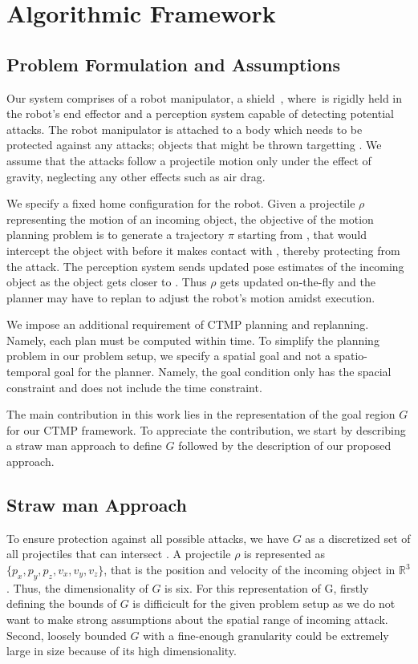 \documentclass[a4paper]{report}
\begin{document}
\section{Algorithmic Framework}
\subsection{Problem Formulation and Assumptions}
Our system comprises of a robot manipulator, a shield~\calS, where~\calS is rigidly held in the robot's end effector and a perception system capable of detecting potential attacks. The robot manipulator is attached to a body \calB which needs to be protected against any attacks; objects that might be thrown targetting \calB. We assume that the attacks follow a projectile motion only under the effect of gravity, neglecting any other effects such as air drag.

We specify a fixed home configuration \Shome for the robot. Given a projectile $\rho$ representing the motion of an incoming object, the objective of the motion planning problem is to generate a trajectory $\pi$ starting from \Shome, that would intercept the object with \calS before it makes contact with \calB, thereby protecting \calB from the attack.
%
The perception system sends updated pose estimates of the incoming object as the object gets closer to \calB. Thus $\rho$ gets updated on-the-fly and the planner may have to replan to adjust the robot's motion amidst execution.

We impose an additional requirement of CTMP planning and replanning. Namely, each plan must be computed within \Tbound time. To simplify the planning problem in our problem setup, we specify a spatial goal and not a spatio-temporal goal for the planner. Namely, the goal condition only has the spacial constraint and does not include the time constraint.

The main contribution in this work lies in the representation of the goal region $G$ for our CTMP framework. To appreciate the contribution, we start by describing a straw man approach to define $G$ followed by the description of our proposed approach.

\subsection{Straw man Approach}
To ensure protection against all possible attacks, we have $G$ as a discretized set of all projectiles that can intersect \calB. A projectile $\rho$ is represented as $\{p_x,p_y,p_z,v_x,v_y,v_z\}$, that is the  position and velocity of the incoming object in $\mathbb{R}^3$. Thus, the dimensionality of $G$ is six. For this representation of G, firstly defining the bounds of $G$ is difficicult for the given problem setup as we do not want to make strong assumptions about the spatial range of incoming attack. Second, loosely bounded $G$ with a fine-enough granularity could be extremely large in size because of its high dimensionality.
\end{document}
